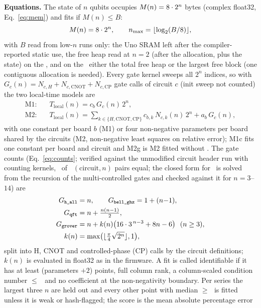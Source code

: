 \textbf{Equations.} The state of $n$ qubits occupies $M(n)=8\cdot2^n$ bytes (complex float32, Eq.~\eqref{eq:mem}) and fits if $M(n)\le B$:
\begin{equation}\label{eq:mem}M(n)=8\cdot2^n,\qquad n_{\max}=\lfloor\log_2(B/8)\rfloor,\end{equation}
with $B$ read from low-$n$ runs only: the Uno SRAM left after the compiler-reported static use, the free heap read at $n=2$ (after the allocation, plus the state) on the \espA, and on the \espB\ either the total free heap or the largest free block (one contiguous allocation is needed). Every gate kernel sweeps all $2^n$ indices, so with $G_c(n)=N_{c,H}+N_{c,\mathrm{CNOT}}+N_{c,\mathrm{CP}}$ gate calls of circuit $c$ (init sweep not counted) the two local-time models are
\begin{align}
\text{M1:}\quad & T_{\mathrm{local}}(n)=c_b\,G_c(n)\,2^n,\label{eq:m1}\\
\text{M2:}\quad & T_{\mathrm{local}}(n)=\sum_{k\in\{H,\mathrm{CNOT},\mathrm{CP}\}}c_{b,k}\,N_{c,k}(n)\,2^n+a_b\,G_c(n),\label{eq:m2}
\end{align}
with one constant per board $b$ (M1) or four non-negative parameters per board shared by the circuits (M2, non-negative least squares on relative error); M1c fits one constant per board and circuit and M2g is M2 fitted without \grover. The gate counts (Eq.~\eqref{eq:counts}; verified against the unmodified circuit header run with counting kernels, \GateCrossN\ of \GateCrossAll\ $(\text{circuit},n)$ pairs equal; the closed form for \grover\ is solved from the recursion of the multi-controlled gates and checked against it for $n=3$--$14$) are
\begin{equation}\label{eq:counts}
\begin{aligned}
G_{\texttt{h\_all}}&=n,\qquad G_{\texttt{bell\_ghz}}=1+(n{-}1),\\
G_{\texttt{qft}}&=n+\tfrac{n(n-1)}{2},\\
G_{\texttt{grover}}&=n+k(n)\bigl(16\cdot3^{\,n-3}+8n-6\bigr)\ \ (n\ge3),\\
k(n)&=\max\bigl(\lfloor\tfrac{\pi}{4}\sqrt{2^n}\rfloor,1\bigr),
\end{aligned}
\end{equation}
split into H, CNOT and controlled-phase (CP) calls by the circuit definitions; $k(n)$ is evaluated in float32 as in the firmware. A fit is called identifiable if it has at least (parameters $+2$) points, full column rank, a column-scaled condition number $\le$ \CondCap\ and no coefficient at the non-negativity boundary. Per series the largest three $n$ are held out and every other point with median $\ge$\,\ModelFloorUs\us\ is fitted unless it is weak or hash-flagged; the score is the mean absolute percentage error
